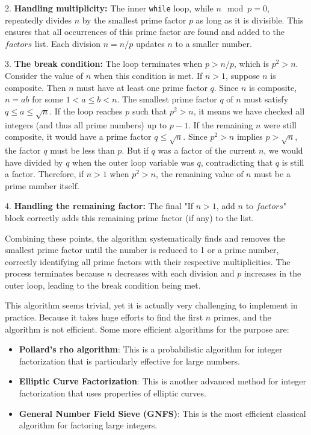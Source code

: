 \documentclass[oneside]{book}
\begin{document}
2.  \textbf{Handling multiplicity:} The inner \texttt{while} loop, while $n \mod p = 0$, repeatedly divides $n$ by the smallest prime factor $p$ as long as it is divisible. This ensures that all occurrences of this prime factor are found and added to the $factors$ list. Each division $n = n / p$ updates $n$ to a smaller number.

3.  \textbf{The break condition:} The loop terminates when $p > n/p$, which is $p^2 > n$. Consider the value of $n$ when this condition is met. If $n > 1$, suppose $n$ is composite. Then $n$ must have at least one prime factor $q$. Since $n$ is composite, $n = ab$ for some $1 < a \le b < n$. The smallest prime factor $q$ of $n$ must satisfy $q \le a \le \sqrt{n}$. If the loop reaches $p$ such that $p^2 > n$, it means we have checked all integers (and thus all prime numbers) up to $p-1$. If the remaining $n$ were still composite, it would have a prime factor $q \le \sqrt{n}$. Since $p^2 > n$ implies $p > \sqrt{n}$, the factor $q$ must be less than $p$. But if $q$ was a factor of the current $n$, we would have divided by $q$ when the outer loop variable was $q$, contradicting that $q$ is still a factor. Therefore, if $n > 1$ when $p^2 > n$, the remaining value of $n$ must be a prime number itself.

4.  \textbf{Handling the remaining factor:} The final "If $n > 1$, add $n$ to $factors$" block correctly adds this remaining prime factor (if any) to the list.

Combining these points, the algorithm systematically finds and removes the smallest prime factor until the number is reduced to 1 or a prime number, correctly identifying all prime factors with their respective multiplicities. The process terminates because $n$ decreases with each division and $p$ increases in the outer loop, leading to the break condition being met.


This algorithm seems trivial, yet it is actually very challenging to implement in practice. Because it takes huge efforts to find the first $n$ primes, and the algorithm is not efficient. Some more efficient algorithms for the purpose are:
\begin{itemize}
	\item \textbf{Pollard's rho algorithm}: This is a probabilistic algorithm for integer factorization that is particularly effective for large numbers.
	\item \textbf{Elliptic Curve Factorization}: This is another advanced method for integer factorization that uses properties of elliptic curves.
	\item \textbf{General Number Field Sieve (GNFS)}: This is the most efficient classical algorithm for factoring large integers.
\end{itemize}
\end{document}

